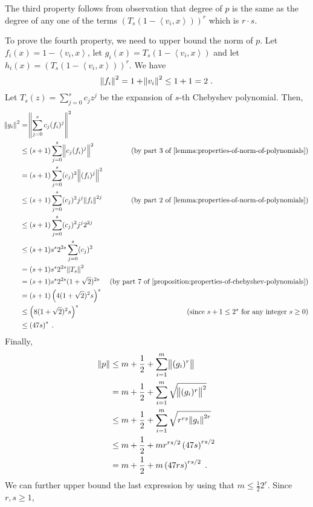 \documentclass[12pt]{article}
\newcommand{\ip}[2]{\left\langle #1, #2 \right\rangle} %
\begin{document}
The third property follows from observation that degree of $p$
is the same as the degree of any one of the terms
$\left( T_s(1 - \ip{v_i}{x}) \right)^r$ which is $r \cdot s$.

To prove the fourth property, we need to upper bound the norm of $p$.
Let $f_i(x) = 1 - \ip{v_i}{x}$, let $g_i(x) = T_s(1 - \ip{v_i}{x})$
and let $h_i(x) = (T_s(1 - \ip{v_i}{x}))^r$. We have
$$
\norm{f_i}^2 = 1 + \norm{v_i}^2 \le 1 + 1 = 2 \; .
$$
Let $T_s(z) = \sum_{j=0}^s c_j z^j$ be the expansion of $s$-th Chebyshev polynomial.
Then,
\begingroup
\allowdisplaybreaks
\begin{align*}
\norm{g_i}^2
& = \norm{ \sum_{j=0}^s c_j (f_i)^j }^2 \\
& \le (s + 1) \sum_{j=0}^s \norm{c_j (f_i)^j}^2 & \text{(by~part 3 of \autoref{lemma:properties-of-norm-of-polynomials})} \\
& = (s + 1) \sum_{j=0}^s (c_j)^2 \norm{(f_i)^j}^2 \\
& \le (s + 1) \sum_{j=0}^s (c_j)^2 j^j \norm{f_i}^{2j} & \text{(by~part 2 of \autoref{lemma:properties-of-norm-of-polynomials})} \\
& \le (s + 1) \sum_{j=0}^s (c_j)^2 j^j 2^{2j} \\
& \le (s + 1) s^s 2^{2s} \sum_{j=0}^s (c_j)^2 \\
& = (s + 1) s^s 2^{2s} \norm{T_s}^2 \\
& = (s + 1) s^s 2^{2s} (1 + \sqrt{2})^{2s} & \text{(by~part 7 of \autoref{proposition:properties-of-chebyshev-polynomials})} \\
& = (s + 1) \left(4(1+\sqrt{2})^2 s \right)^s \\
& \le \left(8(1+\sqrt{2})^2 s \right)^s & \text{(since $s+1 \le 2^s$ for any integer $s \ge 0$)} \\
& \le \left(47 s \right)^s \; .
\end{align*}
\endgroup
Finally,
\begin{align*}
\norm{p}
& \le m + \frac{1}{2} + \sum_{i=1}^m \norm{(g_i)^r} \\
& = m + \frac{1}{2} + \sum_{i=1}^m \sqrt{\norm{(g_i)^r}^2} \\
& \le m + \frac{1}{2} + \sum_{i=1}^m \sqrt{r^{rs} \norm{g_i}^{2r}} \\
& \le m + \frac{1}{2} + m r^{rs/2} \left(47 s \right)^{rs/2} \\
& = m + \frac{1}{2} + m \left(47 rs \right)^{rs/2} \; .
\end{align*}
We can further upper bound the last expression by using that $m \le \frac{1}{2} 2^r$.
Since $r,s \ge 1$,
\end{document}
